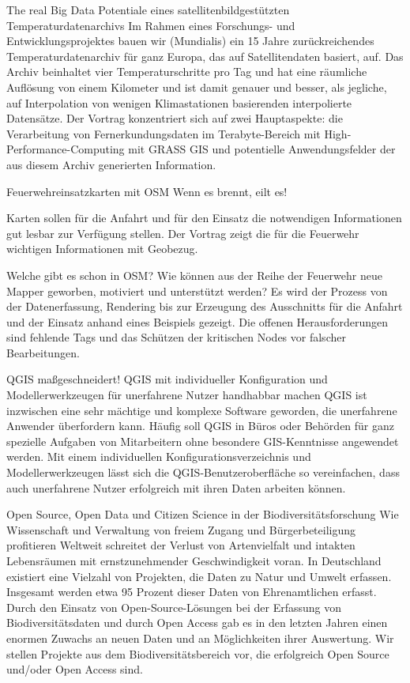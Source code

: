 %
{The real Big Data}
{Potentiale eines satellitenbildgestützten Temperaturdatenarchivs}%
{Im Rahmen eines Forschungs- und Entwicklungsprojektes bauen wir (Mundialis) ein 15 Jahre
  zurückreichendes Temperaturdatenarchiv für ganz Europa, das auf Satellitendaten basiert, auf.
  Das Archiv beinhaltet vier Temperaturschritte pro Tag und hat eine räumliche Auflösung von einem
  Kilometer und ist damit genauer und besser, als jegliche, auf Interpolation von wenigen
  Klimastationen basierenden interpolierte Datensätze.
  Der Vortrag konzentriert sich auf zwei Hauptaspekte: die
  Verarbeitung von Fernerkundungsdaten im Terabyte-Bereich mit High-Performance-Computing mit
  GRASS GIS und potentielle Anwendungsfelder der aus diesem Archiv generierten Information.}

%
{Feuerwehreinsatzkarten mit OSM}%
{Wenn es brennt, eilt es!}%
{Karten sollen für die
  Anfahrt und für den Einsatz die notwendigen Informationen gut lesbar zur Verfügung stellen.
Der Vortrag zeigt die für die Feuerwehr wichtigen Informationen mit Geobezug.

Welche gibt es schon
in OSM? Wie können aus der Reihe der Feuerwehr neue Mapper geworben, motiviert und unterstützt
werden?  Es wird der Prozess von der Datenerfassung, Rendering bis zur Erzeugung des Ausschnitts für
die
Anfahrt und der Einsatz anhand eines Beispiels gezeigt. Die offenen Herausforderungen sind fehlende
Tags und das Schützen der kritischen Nodes vor falscher Bearbeitungen.}

%
{QGIS maßgeschneidert!}%
{QGIS mit individueller Konfiguration und Modellerwerkzeugen für unerfahrene Nutzer handhabbar machen}%
{QGIS ist inzwischen eine sehr mächtige und komplexe Software geworden, die unerfahrene
  Anwender überfordern kann.  Häufig soll QGIS in Büros oder Behörden für ganz spezielle Aufgaben
  von Mitarbeitern ohne besondere
GIS-Kenntnisse angewendet werden.  Mit einem individuellen Konfigurationsverzeichnis und
Modellerwerkzeugen lässt sich die QGIS-Benutzeroberfläche so vereinfachen, dass auch unerfahrene
Nutzer erfolgreich mit ihren Daten arbeiten können. 
}

%
{Open Source, Open Data und Citizen Science in der Biodiversitätsforschung}%
{Wie Wissenschaft und Verwaltung von freiem Zugang und Bürgerbeteiligung profitieren}%
{Weltweit schreitet der Verlust von Artenvielfalt und intakten Lebensräumen mit ernstzunehmender
Geschwindigkeit voran. In Deutschland existiert eine Vielzahl von Projekten, die Daten zu Natur und
Umwelt erfassen. Insgesamt werden etwa 95 Prozent dieser Daten von Ehrenamtlichen erfasst.  Durch
den Einsatz von Open-Source-Lösungen bei der Erfassung von Biodiversitätsdaten und durch Open Access
gab es in den letzten Jahren einen enormen Zuwachs an neuen Daten und an Möglichkeiten ihrer
Auswertung. Wir stellen Projekte aus dem Biodiversitätsbereich vor, die erfolgreich Open Source
und/oder Open Access sind.}

